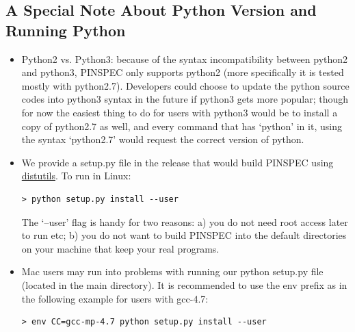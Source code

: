\documentclass[titlepage]{article}
\begin{document}
\clearpage
\subsection{A Special Note About Python Version and Running Python}
\begin{itemize}
\item Python2 vs. Python3: because of the syntax incompatibility between python2 and python3, PINSPEC only supports python2 (more specifically it is tested mostly with python2.7). Developers could choose to update the python source codes into python3 syntax in the future if python3 gets more popular; though for now the easiest thing to do for users with python3 would be to install a copy of python2.7 as well, and every command that has `python' in it, using the syntax `python2.7' would request the correct version of python. 

\item We provide a setup.py file in the release that would build PINSPEC using \href{http://docs.python.org/2/distutils/index.html}{distutils}. To run in Linux:\begin{verbatim}
> python setup.py install --user
\end{verbatim}
The `--user' flag is handy for two reasons: a) you do not need root access later to run etc; b) you do not want to build PINSPEC into the default directories on your machine that keep your real programs.

\item Mac users may run into problems with running our python setup.py file (located in the main directory). It is recommended to use the env prefix as in the following example for users with gcc-4.7:
\begin{verbatim}
> env CC=gcc-mp-4.7 python setup.py install --user
\end{verbatim}
\end{itemize}

\clearpage
\end{document}
